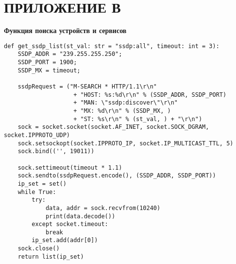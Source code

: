 \chapter*{ПРИЛОЖЕНИЕ В} \label{app:appendix-search-func}

\begin{center}
    \bfseries Функция поиска устройств и сервисов
\end{center}

\begin{verbatim}
def get_ssdp_list(st_val: str = "ssdp:all", timeout: int = 3):
    SSDP_ADDR = "239.255.255.250";
    SSDP_PORT = 1900;
    SSDP_MX = timeout;

    ssdpRequest = ("M-SEARCH * HTTP/1.1\r\n"
                    + "HOST: %s:%d\r\n" % (SSDP_ADDR, SSDP_PORT)
                    + "MAN: \"ssdp:discover\"\r\n"
                    + "MX: %d\r\n" % (SSDP_MX, )
                    + "ST: %s\r\n" % (st_val, ) + "\r\n")
    sock = socket.socket(socket.AF_INET, socket.SOCK_DGRAM, socket.IPPROTO_UDP)
    sock.setsockopt(socket.IPPROTO_IP, socket.IP_MULTICAST_TTL, 5)
    sock.bind(('', 19011))

    sock.settimeout(timeout * 1.1)
    sock.sendto(ssdpRequest.encode(), (SSDP_ADDR, SSDP_PORT))
    ip_set = set()
    while True:
        try:
            data, addr = sock.recvfrom(10240)
            print(data.decode())
        except socket.timeout:
            break
        ip_set.add(addr[0])
    sock.close()
    return list(ip_set)

\end{verbatim}

